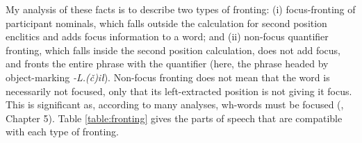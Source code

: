 \begin{comment}
This same pattern with respect to \textit{ʔuuš} is present in Sapir's original data.\footnotemark{} \textit{ʔuušił}, which is \textit{ʔuuš} `some' with the object marking \textit{-L.(č)ił} attached, behaves the same way in my data. \textit{ʔuušił} may be fronted without the second position enclitics, as already seen in (\ref{ex:uushilfront}), or it may then take the enclitics, as in (\ref{ex:uushilfrontclitic}) below. I could not find any \textit{ʔuušił} fronting in the Nootka Texts, so \textit{ʔuušił} fronting may represent a change in the language in the intervening generations.

\footnotetext{\noindent With the clitic complex:

\ex~ \label{ex:uushfrontcliticNT}
\begingl
\glpreamble ʔuušʔaƛ maqw̓in. //
\gla ʔuuš=!aƛ maq-w̓in  //
\glb some=\textsc{now} tie-middle //
\glft `Some are tied about the middle.' \citep[70]{sapir1955} //
\endgl
\xe

\noindent Without the clitic complex:

\ex~ \label{ex:uushfrontnocliticNT}
\begingl
\glpreamble ʔuuš saac̓inłšiʔaƛƛaa ʔaḥʔaa ƛ̓acʔii ƛ̓isitʔi sac̓up. //
\gla ʔuuš saac̓inł-šiƛ=!aƛ=ƛaa ʔaḥʔaa ƛ̓ac=ʔiˑ ƛ̓isit=ʔiˑ sac̓up  //
\glb some seafood.feast(?)-\textsc{mo}=\textsc{now}=also \textsc{dtop} fat=\textsc{art} white=\textsc{art} spring.salmon //
\glft `Some would start feasting with the fat, white-bodied tyee salmon.' \citep[22]{sapir1955} //
\endgl
\xe
}

\ex \label{ex:uushilfrontclitic}
\begingl
\glpreamble ʔuušiłqaˑč̓a n̓aacsa. //
\gla ʔuuš-L.(č)ił=qaˑč̓a n̓aacsa  //
\glb some-\textsc{do.to}=\textsc{infr.3} see.\textsc{cv} //
\glft `He must've seen something.' (\textbf{C}, \textit{tupaat} Julia Lucas) //
\endgl
\xe

I have no examples of the strong quantifier \textit{hišuk} `all' fronting without the second position complex, and it is possibly ungrammatical. The version of the strong quantifier in the Nootka texts, \textit{č̓uučk}, does not occur in a fronting environment where the enclitics unambiguously fall on the following predicate. (That is, in a case where the enclitic could not be a singly null-marked third person morpheme.)
\end{comment}

My analysis of these facts is to describe two types of fronting: (i) focus-fronting of participant nominals, which falls outside the calculation for second position enclitics and adds focus information to a word; and (ii) non-focus quantifier fronting, which falls inside the second position calculation, does not add focus, and fronts the entire phrase with the quantifier (here, the phrase headed by object-marking \textit{-L.(č)ił}). Non-focus fronting does not mean that the word is necessarily not focused, only that its left-extracted position is not giving it focus. This is significant as, according to many analyses, wh-words must be focused (\citealt{lambrecht1996}, Chapter 5). Table \ref{table:fronting} gives the parts of speech that are compatible with each type of fronting.

